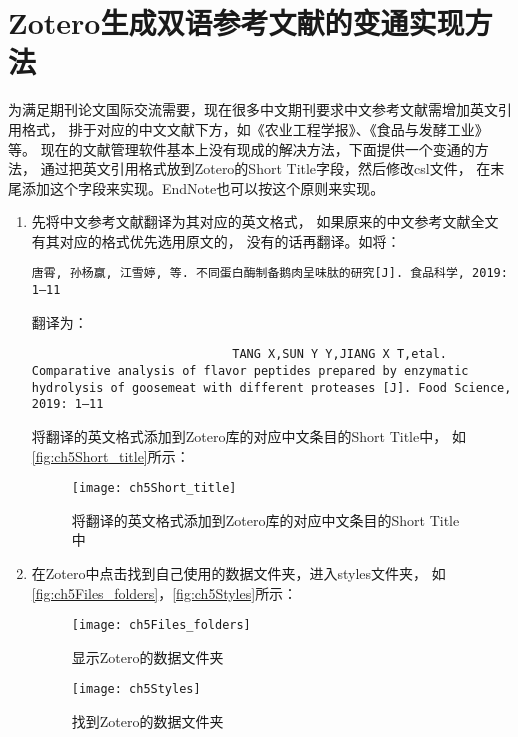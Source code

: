 \documentclass[cn,11pt,chinese]{elegantbook}
\begin{document}
		
	\section{Zotero生成双语参考文献的变通实现方法}\label{sec:Biolan}
				为满足期刊论文国际交流需要，现在很多中文期刊要求中文参考文献需增加英文引用格式，
				排于对应的中文文献下方，如《农业工程学报》、《食品与发酵工业》等。
				现在的文献管理软件基本上没有现成的解决方法，下面提供一个变通的方法，
				通过把英文引用格式放到Zotero的Short Title字段，然后修改csl文件，
				在末尾添加这个字段来实现。EndNote也可以按这个原则来实现。
				\begin{enumerate}
					\item 先将中文参考文献翻译为其对应的英文格式，
						如果原来的中文参考文献全文有其对应的格式优先选用原文的，
						没有的话再翻译。如将：
						\begin{lstlisting}[language=VBScript]
						唐霄, 孙杨赢, 江雪婷, 等. 不同蛋白酶制备鹅肉呈味肽的研究[J]. 食品科学, 2019: 1–11
						\end{lstlisting}
						翻译为：
						\begin{lstlisting}
							TANG X,SUN Y Y,JIANG X T,etal. Comparative analysis of flavor peptides prepared by enzymatic hydrolysis of goosemeat with different proteases [J]. Food Science, 2019: 1–11
						\end{lstlisting}
						将翻译的英文格式添加到Zotero库的对应中文条目的Short Title中，
						如\autoref{fig:ch5Short_title}所示：
						\begin{figure}[ht]
							\centering
							\texttt{[image: ch5Short\_title]}
							\caption{将翻译的英文格式添加到Zotero库的对应中文条目的Short Title中}
							\label{fig:ch5Short_title}
						\end{figure}
						\item 在Zotero中点击找到自己使用的数据文件夹，进入styles文件夹，
							如\autoref{fig:ch5Files_folders}，\autoref{fig:ch5Styles}所示：
							\begin{figure}[ht]
								\centering
								\texttt{[image: ch5Files\_folders]}
								\caption{显示Zotero的数据文件夹}
								\label{fig:ch5Files_folders}
							\end{figure}
							\begin{figure}[ht]
								\centering
								\texttt{[image: ch5Styles]}
								\caption{找到Zotero的数据文件夹}

\end{figure}
\end{enumerate}
\end{document}
